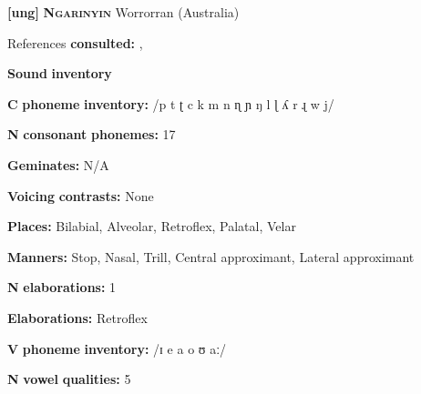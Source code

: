 \begin{styleBody}
\textbf{[ung]}   \textbf{\textsc{Ngarinyin}}  Worrorran (Australia)
\end{styleBody}

\begin{styleBody}
References \textbf{consulted:} \citet{CoateOates1970}, \citet{Rumsey1978}
\end{styleBody}

\begin{styleBody}
\textbf{Sound} \textbf{inventory}
\end{styleBody}

\begin{styleBody}
\textbf{C} \textbf{phoneme} \textbf{inventory:} /p t ʈ c k m n ɳ ɲ ŋ l ɭ ʎ r ɻ w j/
\end{styleBody}

\begin{styleBody}
\textbf{N} \textbf{consonant} \textbf{phonemes:} 17
\end{styleBody}

\begin{styleBody}
\textbf{Geminates:} N/A
\end{styleBody}

\begin{styleBody}
\textbf{Voicing} \textbf{contrasts:} None
\end{styleBody}

\begin{styleBody}
\textbf{Places:} Bilabial, Alveolar, Retroflex, Palatal, Velar
\end{styleBody}

\begin{styleBody}
\textbf{Manners:} Stop, Nasal, Trill, Central approximant, Lateral approximant
\end{styleBody}

\begin{styleBody}
\textbf{N} \textbf{elaborations:} 1
\end{styleBody}

\begin{styleBody}
\textbf{Elaborations:} Retroflex
\end{styleBody}

\begin{styleBody}
\textbf{V} \textbf{phoneme} \textbf{inventory:} /ɪ e a o ʊ aː/
\end{styleBody}

\begin{styleBody}
\textbf{N} \textbf{vowel} \textbf{qualities:} 5
\end{styleBody}

